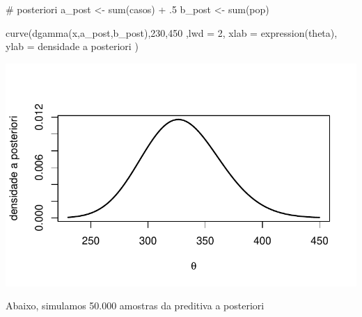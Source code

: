 \documentclass[
  letterpaper,
  DIV=11,
  numbers=noendperiod]{scrreprt}
\newenvironment{Shaded}{\begin{snugshade}}{\end{snugshade}}
\newcommand{\AttributeTok}[1]{\textcolor[rgb]{0.40,0.45,0.13}{#1}}
\newcommand{\CommentTok}[1]{\textcolor[rgb]{0.37,0.37,0.37}{#1}}
\newcommand{\DecValTok}[1]{\textcolor[rgb]{0.68,0.00,0.00}{#1}}
\newcommand{\FunctionTok}[1]{\textcolor[rgb]{0.28,0.35,0.67}{#1}}
\newcommand{\NormalTok}[1]{\textcolor[rgb]{0.00,0.23,0.31}{#1}}
\newcommand{\OtherTok}[1]{\textcolor[rgb]{0.00,0.23,0.31}{#1}}
\newcommand{\SpecialCharTok}[1]{\textcolor[rgb]{0.37,0.37,0.37}{#1}}
\newcommand{\StringTok}[1]{\textcolor[rgb]{0.13,0.47,0.30}{#1}}
\theoremstyle{plain}
\theoremstyle{definition}
\theoremstyle{definition}
\theoremstyle{remark}
\begin{document}
\begin{Shaded}
\begin{Highlighting}[]
\CommentTok{\# posteriori}
\NormalTok{a\_post }\OtherTok{\textless{}{-}} \FunctionTok{sum}\NormalTok{(casos) }\SpecialCharTok{+}\NormalTok{ .}\DecValTok{5}
\NormalTok{b\_post }\OtherTok{\textless{}{-}} \FunctionTok{sum}\NormalTok{(pop)}

\FunctionTok{curve}\NormalTok{(}\FunctionTok{dgamma}\NormalTok{(x,a\_post,b\_post),}\DecValTok{230}\NormalTok{,}\DecValTok{450}\NormalTok{ ,}\AttributeTok{lwd =} \DecValTok{2}\NormalTok{, }\AttributeTok{xlab =} \FunctionTok{expression}\NormalTok{(theta), }\AttributeTok{ylab =} \StringTok{\textquotesingle{}densidade a posteriori\textquotesingle{}}\NormalTok{ )}
\end{Highlighting}
\end{Shaded}

\includegraphics{poisson_files/figure-pdf/unnamed-chunk-2-1.pdf}

Abaixo, simulamos 50.000 amostras da preditiva a posteriori
\end{document}

